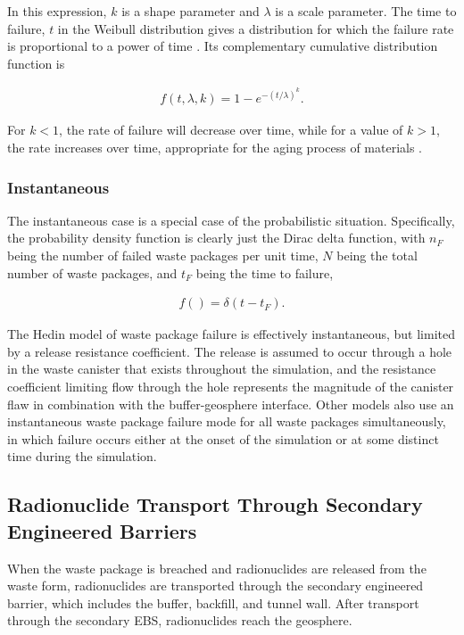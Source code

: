 In this expression, $k$ is a shape parameter and $\lambda$ is a scale
parameter. The time to failure, $t$ in the Weibull distribution gives a 
distribution for which the failure rate is proportional to a power of time 
\cite{papoulis_probability_2002}. Its complementary cumulative distribution
function is 

\begin{align}
  f(t,\lambda,k) = 1-e^{-(t/\lambda)^k}.
  \label{weibullcdf}
\end{align}

For $k<1$, the rate of failure will decrease over time, while for a value of 
$k>1$, the rate increases over time, appropriate for the aging process of 
materials  \cite{papoulis_probability_2002}.


\subsubsection{Instantaneous}

The instantaneous case is a special case of the probabilistic situation.
Specifically, the probability density function is clearly just the Dirac 
delta function, with $n_F$ being the number of failed waste packages per 
unit time, $N$ being the total number of waste packages, and $t_F$ being 
the time to failure,

\begin{align}
  f()= \delta(t-t_F).
  \label{instantaneous}
\end{align}


The Hedin model of waste package failure is effectively instantaneous, but
limited by a release resistance coefficient. The release is assumed  to occur
through a hole in the waste canister that exists throughout the simulation, and
the resistance coefficient limiting flow through the hole represents the
magnitude of the canister flaw in combination with the buffer-geosphere
interface\cite{hedin_integrated_2002}.  Other models also use an instantaneous 
waste package failure mode for all waste  packages simultaneously, in which 
failure occurs either at the onset of the simulation or at some distinct time 
during the simulation. 




\subsection{Radionuclide Transport Through Secondary Engineered Barriers}

When the waste package is breached and radionuclides are released from the waste 
form, radionuclides are transported through the secondary engineered barrier, 
which includes the buffer, backfill, and tunnel wall. After transport through 
the secondary \gls{EBS}, radionuclides reach the geosphere. 

